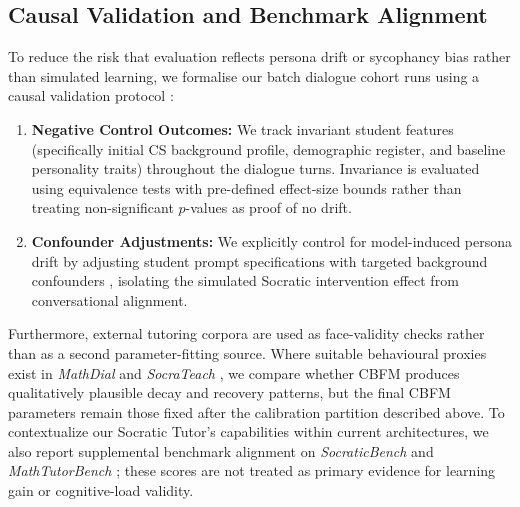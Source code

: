 \documentclass[11pt,a4paper]{report}
\begin{document}
\subsection{Causal Validation and Benchmark Alignment}
To reduce the risk that evaluation reflects persona drift or sycophancy bias rather than simulated learning, we formalise our batch dialogue cohort runs using a causal validation protocol \cite{lin2026illusion}:
\begin{enumerate}
    \item \textbf{Negative Control Outcomes:} We track invariant student features (specifically initial CS background profile, demographic register, and baseline personality traits) throughout the dialogue turns. Invariance is evaluated using equivalence tests with pre-defined effect-size bounds rather than treating non-significant $p$-values as proof of no drift.
    \item \textbf{Confounder Adjustments:} We explicitly control for model-induced persona drift by adjusting student prompt specifications with targeted background confounders \cite{lin2026illusion}, isolating the simulated Socratic intervention effect from conversational alignment.
\end{enumerate}
Furthermore, external tutoring corpora are used as face-validity checks rather than as a second parameter-fitting source. Where suitable behavioural proxies exist in \textit{MathDial} \cite{macina2023mathdial} and \textit{SocraTeach} \cite{liu2024socraticlm}, we compare whether CBFM produces qualitatively plausible decay and recovery patterns, but the final CBFM parameters remain those fixed after the calibration partition described above. To contextualize our Socratic Tutor's capabilities within current architectures, we also report supplemental benchmark alignment on \textit{SocraticBench} \cite{gatti2026socratic} and \textit{MathTutorBench} \cite{mathtutorbench2025}; these scores are not treated as primary evidence for learning gain or cognitive-load validity.
\end{document}
